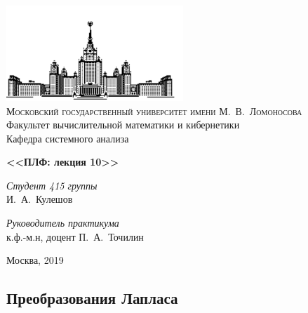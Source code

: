 \documentclass[oneside, final, 12pt]{article}
\theoremstyle{def}
\begin{document}
\thispagestyle{empty}

\begin{center}
\ \vspace{-3cm}

\includegraphics[width=0.5\textwidth]{pict/msu.pdf}\\
{\scshape Московский государственный университет имени М.~В.~Ломоносова}\\
Факультет вычислительной математики и кибернетики\\
Кафедра системного анализа

\vfill

\vspace{5cm}

{\Huge\bfseries <<ПЛФ: лекция 10>>}
\end{center}

\vspace{3cm}

\begin{flushright}
    \large
    \textit{Студент 415 группы}\\
    И.~А.~Кулешов
    \vspace{5mm}
    
    \textit{Руководитель практикума}\\
    к.ф.-м.н, доцент П.~А.~Точилин
\end{flushright}

\vfill

\begin{center}
Москва, 2019
\end{center}

\newpage

	\begin{center}
	\section{Преобразования Лапласа}
	\end{center}
\end{document}
